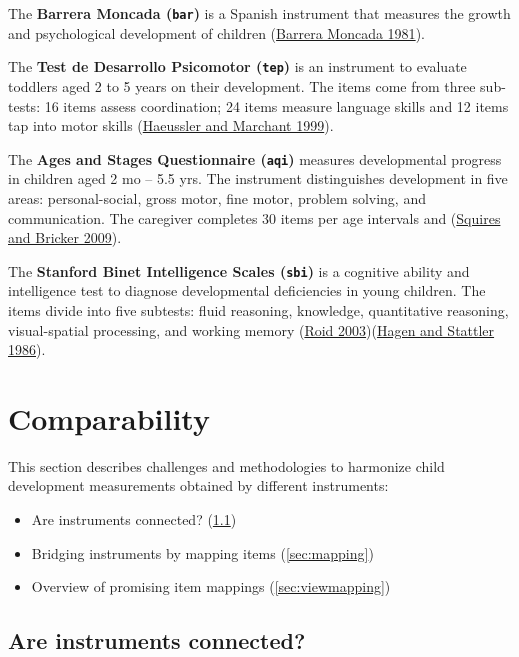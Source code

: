 \documentclass[
]{book}
\providecommand{\tightlist}{%
  \setlength{\itemsep}{0pt}\setlength{\parskip}{0pt}}
\begin{document}
The \textbf{Barrera Moncada (\texttt{bar})} is a Spanish instrument that measures the growth and psychological development of children (\protect\hyperlink{ref-barrera1981}{Barrera Moncada 1981}).

The \textbf{Test de Desarrollo Psicomotor (\texttt{tep})} is an instrument to evaluate toddlers aged 2 to 5 years on their development. The items come from three sub-tests: 16 items assess coordination; 24 items measure language skills and 12 items tap into motor skills (\protect\hyperlink{ref-haeussler1999}{Haeussler and Marchant 1999}).

The \textbf{Ages and Stages Questionnaire (\texttt{aqi})} measures developmental progress in children aged 2 mo -- 5.5 yrs. The instrument distinguishes development in five areas: personal-social, gross motor, fine motor, problem solving, and communication. The caregiver completes 30 items per age intervals and (\protect\hyperlink{ref-squires2009}{Squires and Bricker 2009}).

The \textbf{Stanford Binet Intelligence Scales (\texttt{sbi})} is a cognitive ability and intelligence test to diagnose developmental deficiencies in young children. The items divide into five subtests: fluid reasoning, knowledge, quantitative reasoning, visual-spatial processing, and working memory (\protect\hyperlink{ref-roid2003}{Roid 2003})(\protect\hyperlink{ref-hagen1986}{Hagen and Stattler 1986}).

\newpage

\hypertarget{ch:comparability}{%
\chapter{Comparability}\label{ch:comparability}}

This section describes challenges and methodologies to harmonize child development measurements obtained by different instruments:

\begin{itemize}
\tightlist
\item
  Are instruments connected? (\ref{sec:challenge})
\item
  Bridging instruments by mapping items (\ref{sec:mapping})
\item
  Overview of promising item mappings (\ref{sec:viewmapping})
\end{itemize}

\hypertarget{sec:challenge}{%
\section{Are instruments connected?}\label{sec:challenge}}
\end{document}
